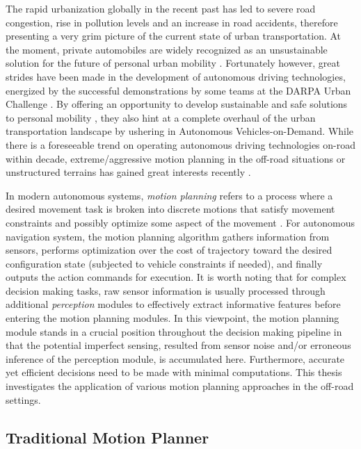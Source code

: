 \documentclass[../thesis.tex]{subfiles}
\begin{document}
The rapid urbanization globally in the recent past has led to severe road congestion, rise in pollution levels and an increase in road accidents, therefore presenting a very grim picture of the current state of urban transportation. 
At the moment, private automobiles are widely recognized as an unsustainable solution for the future of personal urban mobility \cite{reinventing}. 
Fortunately however, great strides have been made in the development of autonomous driving technologies, energized by the successful demonstrations by some teams at the DARPA Urban Challenge \cite{boss, multimodaltartan}. 
By offering an opportunity to develop sustainable and safe solutions to personal mobility \cite{usecases_of_AD}, they also hint at a complete overhaul of the urban transportation landscape by ushering in Autonomous Vehicles-on-Demand. 
While there is a foreseeable trend on operating autonomous driving technologies on-road within decade, extreme/aggressive motion planning in the off-road situations or unstructured terrains has gained great interests recently \cite{kolter2010probabilistic,williams2016aggressive,gray2012predictive,cutler2016autonomous,cutler2014reinforcement}. 

In modern autonomous systems, \textit{motion planning} refers to a process where a desired movement task is broken into discrete motions that satisfy movement constraints and possibly optimize some aspect of the movement \cite{wiki:motion-planning}. 
For autonomous navigation system, the motion planning algorithm gathers information from sensors, performs optimization over the cost of trajectory toward the desired configuration state (subjected to vehicle constraints if needed), and finally outputs the action commands for execution. 
It is worth noting that for complex decision making tasks, raw sensor information is usually processed through additional \textit{perception} modules to effectively extract informative features before entering the motion planning modules.
In this viewpoint, the motion planning module stands in a crucial position throughout the decision making pipeline in that the potential imperfect sensing, resulted from sensor noise and/or erroneous inference of the perception module, is accumulated here. 
Furthermore, accurate yet efficient decisions need to be made with minimal computations.
This thesis investigates the application of various motion planning approaches in the off-road settings.

\subsection{Traditional Motion Planner}
\end{document}
